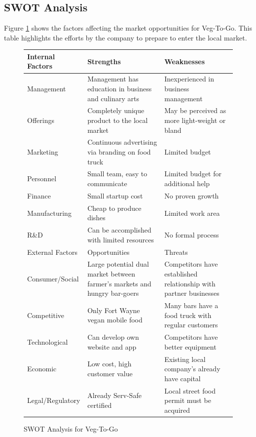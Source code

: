 \documentclass[12pt, letterpaper]{article}
\newcommand{\companyname}{Veg-To-Go}
\begin{document}
\subsection{SWOT Analysis}
Figure \ref{SWOT} shows the factors affecting the market opportunities for \companyname{}.  This table highlights the efforts by the company to prepare to enter the local market.
\singlespacing
\begin{figure}
    \caption{SWOT Analysis for \companyname{}}
    \begin{center}
        \bgroup
        \def\arraystretch{1.5}%
        \begin{tabularx}{\textwidth}{|X X X|}
            \hline
            Internal Factors & Strengths & Weaknesses\\
            \hline
            Management & Management has education in business and culinary arts & Inexperienced in business management\\
            \hline
            Offerings & Completely unique product to the local market & May be perceived as more light-weight or bland\\
            \hline
            Marketing & Continuous advertising via branding on food truck & Limited budget\\
            \hline
            Personnel & Small team, easy to communicate & Limited budget for additional help\\
            \hline
            Finance & Small startup cost & No proven growth\\
            \hline
            Manufacturing & Cheap to produce dishes & Limited work area\\
            \hline
            R\&D & Can be accomplished with limited resources & No formal process\\
            \hline
            \hline
            External Factors & Opportunities & Threats \\
            \hline
            Consumer/Social & Large potential dual market between farmer's markets and hungry bar-goers & Competitors have established relationship with partner businesses \\
            \hline
            Competitive & Only Fort Wayne vegan mobile food & Many bars have a food truck with regular customers \\
            \hline
            Technological & Can develop own website and app & Competitors have better equipment \\
            \hline
            Economic & Low cost, high customer value & Existing local company's already have capital \\
            \hline
            Legal/Regulatory & Already Serv-Safe certified & Local street food permit must be acquired \\
            \hline
        \end{tabularx}
        \egroup
        \label{SWOT}
    \end{center}
\end{figure}
\doublespacing
\end{document}
